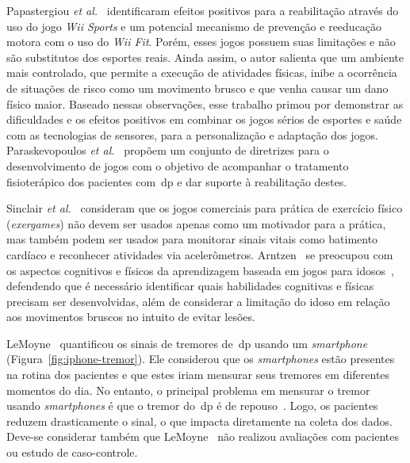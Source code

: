 Papastergiou \textit{et al.}~\cite{Papastergiou:2009:EPC:1570538.1570707} identificaram efeitos positivos para a reabilitação através do uso do jogo \textit{Wii Sports} e um potencial mecanismo de prevenção e reeducação motora com o uso do \textit{Wii Fit}. Porém, esses jogos possuem suas limitações e não são substitutos dos esportes reais. Ainda assim, o autor salienta que um ambiente mais controlado, que permite a execução de atividades físicas, inibe a ocorrência de situações de risco como um movimento brusco e que venha causar um dano físico maior. Baseado nessas observações, esse trabalho primou por demonstrar as dificuldades e os efeitos positivos em combinar os jogos sérios de esportes e saúde com as tecnologias de sensores, para a personalização e adaptação dos jogos. Paraskevopoulos \textit{et al.}~\cite{sacbespoke2014} propõem um conjunto de diretrizes para o desenvolvimento de jogos com o objetivo de acompanhar o tratamento fisioterápico dos pacientes com~\ac{dp} e dar suporte à reabilitação destes.

Sinclair \textit{et al.}~\cite{Sinclair:2009:UVB:1515604.1515617} consideram que os jogos comerciais para prática de exercício físico (\textit{exergames}) não devem ser usados apenas como um motivador para a prática, mas também podem ser usados para monitorar sinais vitais como batimento cardíaco e reconhecer atividades via acelerômetros. Arntzen~\cite{arntzen2011} se preocupou com os aspectos cognitivos e físicos da aprendizagem baseada em jogos para idosos~\cite{arntzen2011}, defendendo que é necessário identificar quais habilidades cognitivas e físicas precisam ser desenvolvidas, além de considerar a limitação do idoso em relação aos movimentos bruscos no intuito de evitar lesões.

LeMoyne~\cite{lemoyne2010} quantificou os sinais de tremores de~\ac{dp} usando um \textit{smartphone} (Figura~\ref{fig:iphone-tremor}). Ele considerou que os \textit{smartphones} estão presentes na rotina dos pacientes e que estes iriam mensurar seus tremores em diferentes momentos do dia. No entanto, o principal problema em mensurar o tremor usando \textit{smartphones} é que o tremor do~\ac{dp} é de repouso~\cite{jankovic2008}. Logo, os pacientes reduzem drasticamente o sinal, o que impacta diretamente na coleta dos dados. Deve-se considerar também que LeMoyne~\cite{lemoyne2010} não realizou avaliações com pacientes ou estudo de caso-controle. 


